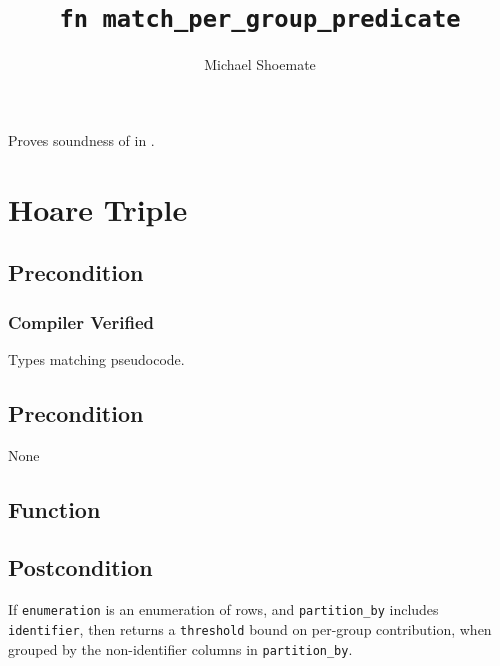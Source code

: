 \documentclass{article}
\title{\texttt{fn match\_per\_group\_predicate}}
\author{Michael Shoemate}
\begin{document}
\maketitle  


\contrib

Proves soundness of  
in .

\section{Hoare Triple}
\subsection*{Precondition}
\subsubsection*{Compiler Verified}
Types matching pseudocode.

\subsection*{Precondition}
None 

\subsection*{Function}
\label{sec:python-pseudocode}


\subsection*{Postcondition}
\begin{theorem}[Postcondition]
    If \texttt{enumeration} is an enumeration of rows,
    and \texttt{partition\_by} includes \texttt{identifier},
    then returns a \texttt{threshold} bound on per-group contribution,
    when grouped by the non-identifier columns in \texttt{partition\_by}.
\end{theorem}
\end{document}
